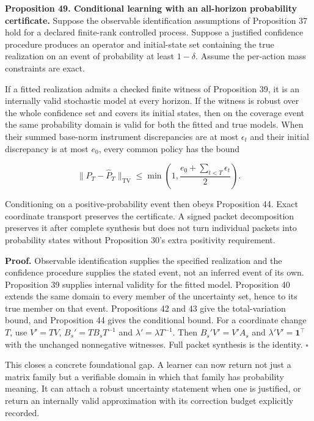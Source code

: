 \textbf{Proposition 49. Conditional learning with an all-horizon
probability certificate.} Suppose the observable identification
assumptions of Proposition 37 hold for a declared finite-rank controlled
process. Suppose a justified confidence procedure produces an operator
and initial-state set containing the true realization on an event of
probability at least \(1-\delta\). Assume the per-action mass
constraints are exact.

If a fitted realization admits a checked finite witness of Proposition
39, it is an internally valid stochastic model at every horizon. If the
witness is robust over the whole confidence set and covers its initial
states, then on the coverage event the same probability domain is valid
for both the fitted and true models. When their summed base-norm
instrument discrepancies are at most \(\epsilon_t\) and their initial
discrepancy is at most \(e_0\), every common policy has the bound

\[
\|P_T-\widehat P_T\|_{\mathrm{TV}}
\leq\min\left(1,\frac{e_0+\sum_{t<T}\epsilon_t}{2}\right).
\]

Conditioning on a positive-probability event then obeys Proposition 44.
Exact coordinate transport preserves the certificate. A signed packet
decomposition preserves it after complete synthesis but does not turn
individual packets into probability states without Proposition 30's
extra positivity requirement.

\textbf{Proof.} Observable identification supplies the specified
realization and the confidence procedure supplies the stated event, not
an inferred event of its own. Proposition 39 supplies internal validity
for the fitted model. Proposition 40 extends the same domain to every
member of the uncertainty set, hence to its true member on that event.
Propositions 42 and 43 give the total-variation bound, and Proposition
44 gives the conditional bound. For a coordinate change \(T\), use
\(V'=TV\), \(B_s'=TB_sT^{-1}\) and \(\lambda'=\lambda T^{-1}\). Then
\(B_s'V'=V'A_s\) and \(\lambda'V'=\mathbf1^\top\) with the unchanged
nonnegative witnesses. Full packet synthesis is the identity.
\(\square\)

This closes a concrete foundational gap. A learner can now return not
just a matrix family but a verifiable domain in which that family has
probability meaning. It can attach a robust uncertainty statement when
one is justified, or return an internally valid approximation with its
correction budget explicitly recorded.

